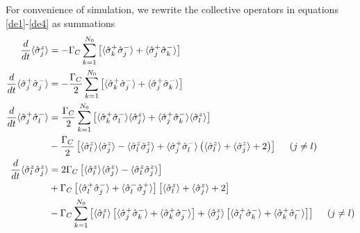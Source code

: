 \documentclass{article}
\newcommand{\gc}{\Gamma_C}
\begin{document}

For convenience of simulation, we rewrite the collective operators in equations \ref{de1}-\ref{de4} as summations
\begin{align}
\label{de1.1}
\frac{d}{dt}\langle\hat{\sigma}^z_j\rangle&=-\gc\sum_{k=1}^{N_0}\left[\langle\hat{\sigma}_k^+\hat{\sigma}^-_j\rangle+\langle\hat{\sigma}_j^+\hat{\sigma}_k^-\rangle\right]\\
\frac{d}{dt}\langle\hat{\sigma}^+_j\hat{\sigma}^-_j\rangle&=-\frac{\gc}{2}\sum_{k=1}^{N_0}\left[\langle\hat{\sigma}_k^+\hat{\sigma}^-_j\rangle+\langle\hat{\sigma}_j^+\hat{\sigma}_k^-\rangle\right]\\\notag
\frac{d}{dt}\langle\hat{\sigma}^+_j\hat{\sigma}^-_l\rangle&=\frac{\gc}{2}\sum_{k=1}^{N_0}\left[\langle\hat{\sigma}_k^+\hat{\sigma}_l^-\rangle \langle \hat{\sigma}_j^z\rangle+\langle\hat{\sigma}^+_j\hat{\sigma}_k^-\rangle \langle \hat{\sigma}_l^z\rangle\right]\\
&-\frac{\gc}{2}\left[\langle\hat{\sigma}_l^z\rangle \langle \hat{\sigma}_j^z\rangle-\langle\hat{\sigma}_l^z \hat{\sigma}_j^z\rangle
+\langle\hat{\sigma}_j^+ \hat{\sigma}_l^-\rangle\left(\langle\hat{\sigma}_l^z\rangle +\langle \hat{\sigma}_j^z\rangle+2\right)\right]\ \ \ \ (j\neq l)\\\notag
\frac{d}{dt}\langle\hat{\sigma}_l^z \hat{\sigma}_j^z\rangle&=2\gc\left[\langle\hat{\sigma}_l^z\rangle \langle \hat{\sigma}_j^z\rangle-\langle\hat{\sigma}_l^z \hat{\sigma}_j^z\rangle\right]\\\notag
&+\gc\left[\langle\hat{\sigma}_l^+\hat{\sigma}_j^-\rangle+\langle\hat{\sigma}_l^-\hat{\sigma}_j^+\rangle\right]\left[\langle\hat{\sigma}_l^z\rangle+\langle \hat{\sigma}_j^z\rangle+2\right]\\
\label{de4.1}
&-\gc\sum_{k=1}^{N_0}\left[\langle\hat{\sigma}_l^z\rangle\left[\langle\hat{\sigma}_j^+\hat{\sigma}_k^-\rangle+\langle\hat{\sigma}_k^+\hat{\sigma}_j^-\rangle\right]+\langle\hat{\sigma}_j^z\rangle\left[\langle\hat{\sigma}_l^+\hat{\sigma}_k^-\rangle+\langle\hat{\sigma}_k^+\hat{\sigma}_l^-\rangle\right]\right]\ \ \ \ (j\neq l)
\end{align}
\end{document}
